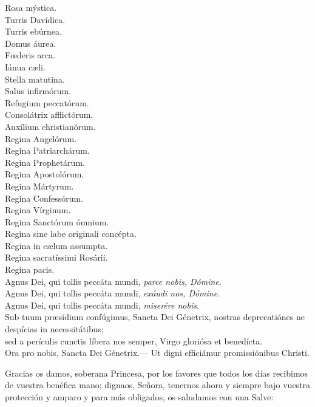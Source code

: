 \documentclass[./rosary.tex]{subfiles}
\begin{document}
\begin{multicols}{2}
    Rosa mýstica.\\
    Turris Davídica.\\
    Turris ebúrnea.\\
    Domus áurea.\\
    Fœderis arca.\\
    Iánua cæli.\\
    Stella matutina.\\
    Salus infirmórum.\\
    Refugium peccatórum.\\
    Consolátrix af­flic­tórum.\\
    Auxílium chris­tia­nórum.\\
    Regina Angelórum.\\
    Regina Pa­triar­chárum.\\
    Regina Pro­phe­tárum.\\
    Regina Apos­to­lórum.\\
    Regina Mártyrum.\\
    Regina Con­fe­ssórum.\\
    Regina Vírginum.\\
    Regina Sanctórum ómnium.\\
    Regina sine labe originali concépta.\\
    Regina in cælum assumpta.\\
    Regina sa­cra­tíssimi Rosárii.\\
    Regina pacis.\\
    Agnus Dei, qui tollis peccáta mundi, \emph{parce nobis, Dómine}.\\
    Agnus Dei, qui tollis peccáta mundi, \emph{exáudi nos, Dómine}.\\
    Agnus Dei, qui tollis peccáta mundi, \emph{miserére nobis}.\\
    Sub tuum præsídium confúgimus, Sancta Dei Génetrix, nostras de­pre­ca­tiónes ne despícias in ne­ces­si­tátibus;\\
    sed a perículis cunctis líbera nos semper, Virgo gloriósa et benedícta.\\
    Ora pro nobis, Sancta Dei Génetrix.--- Ut digni efficiámur pro­mi­ssiónibus Christi.
\end{multicols}

Gracias os damos, soberana Princesa, por los favores que todos los días recibimos de vuestra benéfica mano; dignaos, Señora, tenernos ahora
y siempre bajo vuestra protección y amparo y para más obligados, os saludamos con una Salve:
\end{document}
